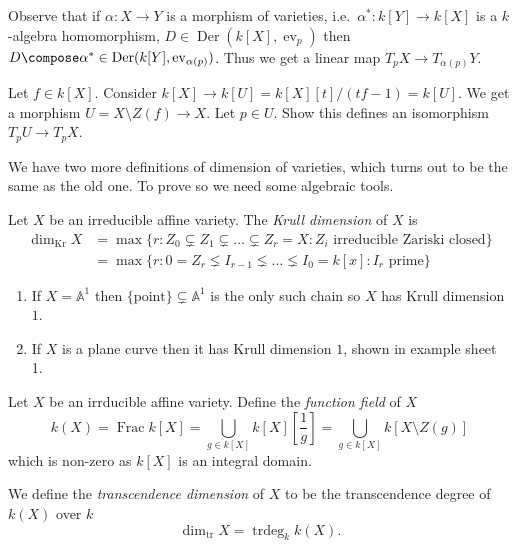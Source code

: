 \documentclass[a4paper]{article}
\renewcommand{\A}{\mathbb{A}}
\DeclareMathOperator{\ev}{ev}
\DeclareMathOperator{\Der}{Der} %
\begin{document}
Observe that if \(\alpha: X \to Y\) is a morphism of varieties, i.e.\ \(\alpha^*: k[Y] \to k[X]\) is a \(k\)-algebra homomorphism, \(D \in \Der(k[X], \ev_p)\) then \(D \compose \alpha^* \in \Der(k[Y], \ev_{\alpha(p)})\). Thus we get a linear map \(T_pX \to T_{\alpha(p)}Y\).

\begin{ex}
  Let \(f \in k[X]\). Consider \(k[X] \to k[U] = k[X][t]/(tf - 1) = k[U]\). We get a morphism \(U = X \setminus Z(f) \to X\). Let \(p \in U\). Show this defines an isomorphism \(T_pU \to T_pX\).
\end{ex}

We have two more definitions of dimension of varieties, which turns out to be the same as the old one. To prove so we need some algebraic tools.

\begin{definition}
  Let \(X\) be an irreducible affine variety. The \emph{Krull dimension} of \(X\) is
  \begin{align*}
    \dim_{\text{Kr}} X
    &= \max \{r: Z_0 \subsetneq Z_1 \subsetneq \dots \subsetneq Z_r = X: Z_i \text{ irreducible Zariski closed}\} \\
    &= \max \{r: 0 = Z_r \lneq I_{r - 1} \lneq \dots \lneq I_0 = k[x]: I_r \text{ prime}\}
  \end{align*}
\end{definition}

\begin{eg}\leavevmode
  \begin{enumerate}
  \item If \(X = \A^1\) then \(\{\text{point}\} \subsetneq \A^1\) is the only such chain so \(X\) has Krull dimension \(1\).
  \item If \(X\) is a plane curve then it has Krull dimension \(1\), shown in example sheet 1.
  \end{enumerate}
\end{eg}

\begin{definition}
  Let \(X\) be an irrducible affine variety. Define the \emph{function field} of \(X\)
  \[
    k(X)
    = \operatorname{Frac} k[X]
    = \bigcup_{g \in k[X]} k[X][\frac{1}{g}]
    = \bigcup_{g \in k[X]} k[X \setminus Z(g)]
  \]
  which is non-zero as \(k[X]\) is an integral domain.

  We define the \emph{transcendence dimension} of \(X\) to be the transcendence degree of \(k(X)\) over \(k\)
  \[
    \dim_{\text{tr}} X = \operatorname{trdeg}_k k(X).
  \]
\end{definition}
\end{document}
